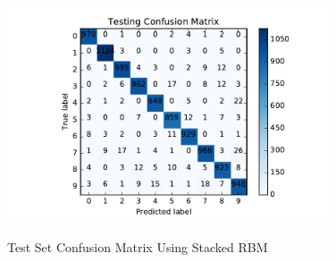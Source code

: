 \begin{figure}[H]
\centering
\includegraphics[width=0.85\textwidth]{./figures/test_stacking.pdf}\
\caption{\label{fig:test_stack} Test Set Confusion Matrix Using Stacked RBM}
\end{figure}


\clearpage
%
%
%



